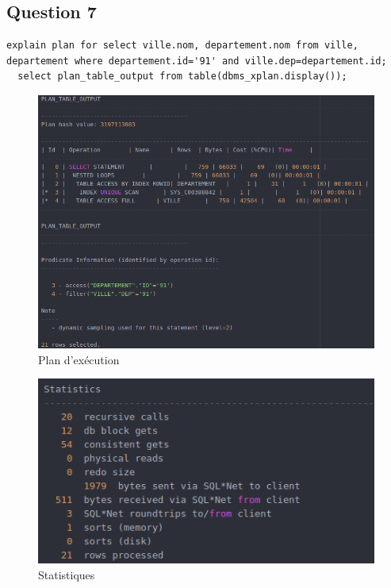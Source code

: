 \documentclass[a4paper,12pt]{article}
\begin{document}
\subsection{Question 7}
\begin{lstlisting}[caption={plan d'exécution choisi par l'optimiseur pour la requête permettant d'afficher le nom des villes et du département dont le numéro est 91 (id)}]
  explain plan for select ville.nom, departement.nom from ville, departement where departement.id='91' and ville.dep=departement.id;
  select plan_table_output from table(dbms_xplan.display());
\end{lstlisting}

\begin{figure}[!ht]
  \centering
  \includegraphics[scale=0.6]{images/q7_1.png}
  \caption{Plan d'exécution}
\end{figure}

\begin{figure}[!ht]
  \centering
  \includegraphics[scale=0.6]{images/q7_2.png}
  \caption{Statistiques}
\end{figure}
\end{document}

